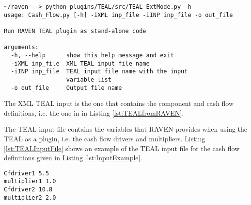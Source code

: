 \small
\begin{lstlisting}[caption=TEAL run as stand-alone python code, label=lst:TEALAsCode]
~/raven --> python plugins/TEAL/src/TEAL_ExtMode.py -h
usage: Cash_Flow.py [-h] -iXML inp_file -iINP inp_file -o out_file

Run RAVEN TEAL plugin as stand-alone code

arguments:
  -h, --help      show this help message and exit
  -iXML inp_file  XML TEAL input file name
  -iINP inp_file  TEAL input file name with the input
                  variable list
  -o out_file     Output file name
\end{lstlisting}
\normalsize

The XML TEAL input is the one that contains the component and cash flow definitions, i.e. the one in  in Listing \ref{lst:TEALfromRAVEN}.

The TEAL input file contains the variables that RAVEN provides when using the TEAL as a plugin, i.e. the cash flow drivers and multipliers. Listing \ref{lst:TEALInputFile} shows an example of the TEAL input file for the cash flow definitions given in Listing \ref{lst:InputExample}.

\begin{lstlisting}[caption=TEAL run as stand-alone python code, label=lst:TEALInputFile]
Cfdriver1 5.5
multiplier1 1.0
Cfdriver2 10.8
multiplier2 2.0
\end{lstlisting}
